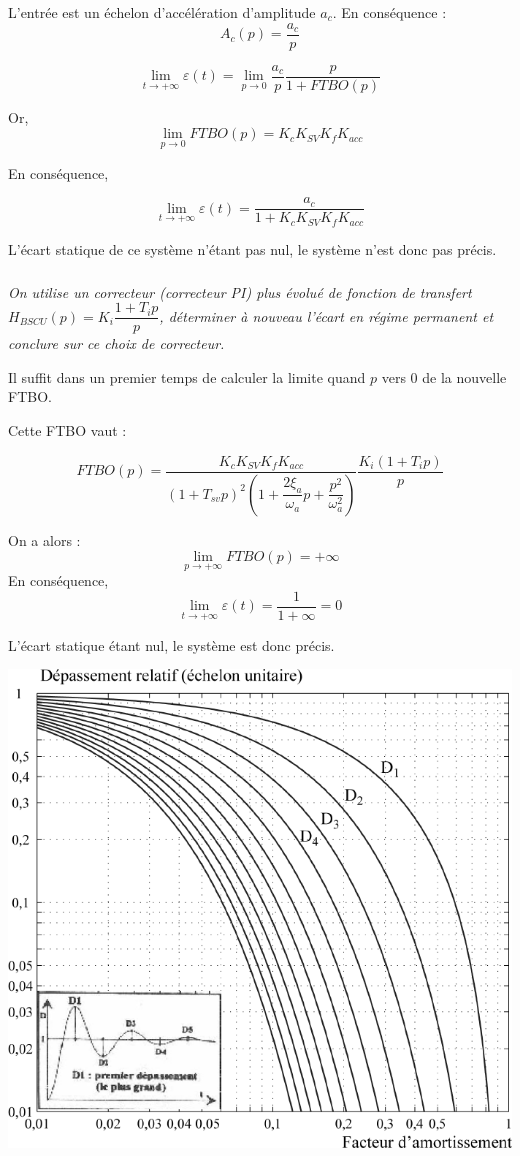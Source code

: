 \documentclass[10pt,fleqn]{article} %
\begin{document}
\begin{multicols}{2}
\begin{corrige}
L'entrée est un échelon d'accélération d'amplitude $a_c$. En conséquence : 
$$A_c (p)=\dfrac{a_c}{p}$$

$$
\lim\limits_{t\to +\infty} \varepsilon(t) = \lim\limits_{p\to 0}
\dfrac{a_c}{p} \dfrac{p}{1+FTBO(p)}
$$

Or, 
$$
 \lim\limits_{p\to 0} FTBO(p) = K_cK_{SV}K_fK_{acc}
$$

En conséquence, 

$$
\lim\limits_{t\to +\infty} \varepsilon(t) = \dfrac{a_c}{1+K_cK_{SV}K_fK_{acc}}
$$

L'écart statique de ce système n'étant pas nul, le système n'est donc pas
précis.

\end{corrige}
\else
\fi


\subparagraph{}
\textit{On utilise un correcteur (correcteur PI) plus évolué de fonction de transfert
$H_{BSCU}(p)=K_i\dfrac{1+T_i p}{p}$, déterminer à nouveau l'écart en régime permanent et conclure sur ce choix de correcteur.}
\ifprof
\begin{corrige}

Il suffit dans un premier temps de calculer la limite quand $p$ vers 0 
de la nouvelle FTBO. 

Cette FTBO vaut :

$$
FTBO(p)=
\dfrac{K_cK_{SV}K_fK_{acc}}{\left( 1+T_{sv}p
\right)^2\left(1+\dfrac{2\xi_a}{\omega_a}p+\dfrac{p^2}{\omega_a^2}\right)}
\dfrac{K_i\left(1+T_i p\right)}{p}
$$

On a alors :
$$
\lim\limits_{p\to+\infty}FTBO(p)=+\infty
$$
En conséquence, 
$$
\lim\limits_{t\to +\infty} \varepsilon(t) = \dfrac{1}{1+\infty} = 0
$$

L'écart statique étant nul, le système est donc précis.

\end{corrige}
\else
\fi

\ifprof
\else
\begin{center}
\includegraphics[width=.75\linewidth]{images/image17.png}
\end{center}


\end{multicols}
\end{document}
